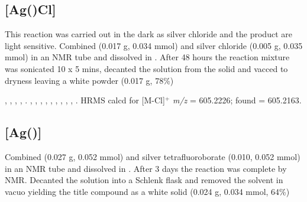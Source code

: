
\subsection*{[Ag(\tBuxantphos)Cl]}


This reaction was carried out in the dark as silver chloride and the product are light sensitive.  Combined \tBuxantphos{} (0.017 g, 0.034 mmol) and silver chloride (0.005 g, 0.035 mmol) in an NMR tube and dissolved in .  After 48 hours the reaction mixture was sonicated 10 x 5 mins, decanted the solution from the solid and vacced to dryness leaving a white powder (0.017 g, 78\%)

,
,
,
,
.
,
,
,
,
,
,
,
,
,
.
HRMS calcd for  [M-Cl]$^+$ \emph{m/z} = 605.2226; found = 605.2163.


\subsection*{\texorpdfstring{[Ag(\tBusixantphos)]} A}


Combined \tBusixantphos{} (0.027 g, 0.052 mmol) and silver tetrafluoroborate (0.010, 0.052 mmol) in an NMR tube and dissolved in .  After 3 days the reaction was complete by NMR.  Decanted the solution into a Schlenk flask and removed the solvent in vacuo yielding the title compound as a white solid (0.024 g, 0.034 mmol, 64\%)

